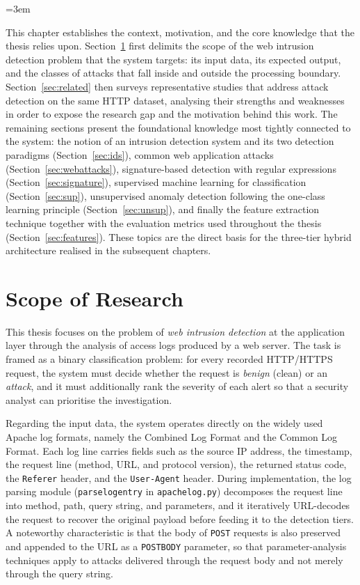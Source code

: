\documentclass[../main.tex]{subfiles}
\begin{document}
\emergencystretch=3em
\renewcommand{\_}{\textunderscore\allowbreak}
\raggedbottom

This chapter establishes the context, motivation, and the core knowledge
that the thesis relies upon. Section~\ref{sec:scope} first delimits the
scope of the web intrusion detection problem that the system targets: its
input data, its expected output, and the classes of attacks that fall
inside and outside the processing boundary. Section~\ref{sec:related}
then surveys representative studies that address attack detection on the
same HTTP dataset, analysing their strengths and weaknesses in order to
expose the research gap and the motivation behind this work. The
remaining sections present the foundational knowledge most tightly
connected to the system: the notion of an intrusion detection system and
its two detection paradigms (Section~\ref{sec:ids}), common web
application attacks (Section~\ref{sec:webattacks}), signature-based
detection with regular expressions (Section~\ref{sec:signature}),
supervised machine learning for classification (Section~\ref{sec:sup}),
unsupervised anomaly detection following the one-class learning principle
(Section~\ref{sec:unsup}), and finally the feature extraction technique
together with the evaluation metrics used throughout the thesis
(Section~\ref{sec:features}). These topics are the direct basis for the
three-tier hybrid architecture realised in the subsequent chapters.

\section{Scope of Research}
\label{sec:scope}

This thesis focuses on the problem of \emph{web intrusion detection} at
the application layer through the analysis of access logs produced by a
web server. The task is framed as a binary classification problem: for
every recorded HTTP/HTTPS request, the system must decide whether the
request is \emph{benign} (clean) or an \emph{attack}, and it must
additionally rank the severity of each alert so that a security analyst
can prioritise the investigation.

Regarding the input data, the system operates directly on the widely used
Apache log formats, namely the Combined Log Format and the Common Log
Format. Each log line carries fields such as the source IP address, the
timestamp, the request line (method, URL, and protocol version), the
returned status code, the \texttt{Referer} header, and the
\texttt{User-Agent} header. During implementation, the log parsing module
(\texttt{parse\_log\_entry} in \texttt{apache\_log.py}) decomposes the
request line into method, path, query string, and parameters, and it
iteratively URL-decodes the request to recover the original payload before
feeding it to the detection tiers. A noteworthy characteristic is that the
body of \texttt{POST} requests is also preserved and appended to the URL
as a \texttt{POST\_BODY} parameter, so that parameter-analysis techniques
apply to attacks delivered through the request body and not merely through
the query string.
\end{document}
